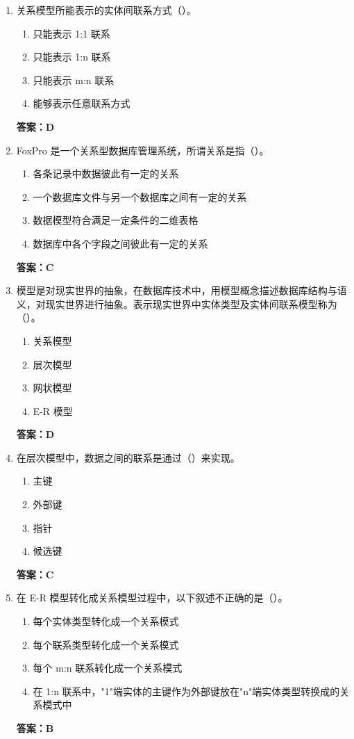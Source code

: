 \documentclass[12pt, a4paper]{article}
\begin{document}
\begin{enumerate}[label=\arabic*.]
	\item 关系模型所能表示的实体间联系方式（\quad）。
	      \begin{enumerate}
		      \item 只能表示 1:1 联系
		      \item 只能表示 1:n 联系
		      \item 只能表示 m:n 联系
		      \item 能够表示任意联系方式
	      \end{enumerate}
	      \textbf{答案：D}

	\item FoxPro 是一个关系型数据库管理系统，所谓关系是指（\quad）。
	      \begin{enumerate}
		      \item 各条记录中数据彼此有一定的关系
		      \item 一个数据库文件与另一个数据库之间有一定的关系
		      \item 数据模型符合满足一定条件的二维表格
		      \item 数据库中各个字段之间彼此有一定的关系
	      \end{enumerate}
	      \textbf{答案：C}

	\item 模型是对现实世界的抽象，在数据库技术中，用模型概念描述数据库结构与语义，对现实世界进行抽象。表示现实世界中实体类型及实体间联系模型称为（\quad）。
	      \begin{enumerate}
		      \item 关系模型
		      \item 层次模型
		      \item 网状模型
		      \item E-R 模型
	      \end{enumerate}
	      \textbf{答案：D}

	\item 在层次模型中，数据之间的联系是通过（\quad）来实现。
	      \begin{enumerate}
		      \item 主键
		      \item 外部键
		      \item 指针
		      \item 候选键
	      \end{enumerate}
	      \textbf{答案：C}

	\item 在 E-R 模型转化成关系模型过程中，以下叙述不正确的是（\quad）。
	      \begin{enumerate}
		      \item 每个实体类型转化成一个关系模式
		      \item 每个联系类型转化成一个关系模式
		      \item 每个 m:n 联系转化成一个关系模式
		      \item 在 1:n 联系中，"1"端实体的主键作为外部键放在"n"端实体类型转换成的关系模式中
	      \end{enumerate}
	      \textbf{答案：B}


\end{enumerate}
\end{document}
